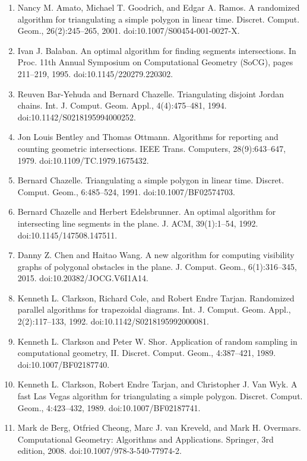\begin{enumerate}
\item[]  [1]  Nancy M. Amato, Michael T. Goodrich, and Edgar A. Ramos.  A randomized algorithm for triangulating a simple polygon in linear time.  Discret. Comput. Geom., 26(2):245–265, 2001.  doi:10.1007/S00454-001-0027-X.  
\item[]  [2]  Ivan J. Balaban.  An optimal algorithm for finding segments intersections.  In Proc. 11th Annual Symposium on Computational Geometry (SoCG), pages 211–219, 1995.  doi:10.1145/220279.220302.  
\item[]  [3]  Reuven Bar-Yehuda and Bernard Chazelle.  Triangulating disjoint Jordan chains.  Int. J. Comput. Geom. Appl., 4(4):475–481, 1994.  doi:10.1142/S0218195994000252.  
\item[]  [4]  Jon Louis Bentley and Thomas Ottmann.  Algorithms for reporting and counting geometric intersections.  IEEE Trans. Computers, 28(9):643–647, 1979.  doi:10.1109/TC.1979.1675432.  
\item[]  [5]  Bernard Chazelle.  Triangulating a simple polygon in linear time.  Discret. Comput. Geom., 6:485–524, 1991.  doi:10.1007/BF02574703.  
\item[]  [6]  Bernard Chazelle and Herbert Edelsbrunner.  An optimal algorithm for intersecting line segments in the plane.  J. ACM, 39(1):1–54, 1992.  doi:10.1145/147508.147511.  
\item[]  [7]  Danny Z. Chen and Haitao Wang.  A new algorithm for computing visibility graphs of polygonal obstacles in the plane.  J. Comput. Geom., 6(1):316–345, 2015.  doi:10.20382/JOCG.V6I1A14.  
\item[]  [8]  Kenneth L. Clarkson, Richard Cole, and Robert Endre Tarjan.  Randomized parallel algorithms for trapezoidal diagrams.  Int. J. Comput. Geom. Appl., 2(2):117–133, 1992.  doi:10.1142/S0218195992000081.  
\item[]  [9]  Kenneth L. Clarkson and Peter W. Shor.  Application of random sampling in computational geometry, II.  Discret. Comput. Geom., 4:387–421, 1989.  doi:10.1007/BF02187740.  
\item[]  [10]  Kenneth L. Clarkson, Robert Endre Tarjan, and Christopher J. Van Wyk.  A fast Las Vegas algorithm for triangulating a simple polygon.  Discret. Comput. Geom., 4:423–432, 1989.  doi:10.1007/BF02187741.  
\item[]  [11]  Mark de Berg, Otfried Cheong, Marc J. van Kreveld, and Mark H. Overmars.  Computational Geometry: Algorithms and Applications.  Springer, 3rd edition, 2008.  doi:10.1007/978-3-540-77974-2.  

\end{enumerate}
